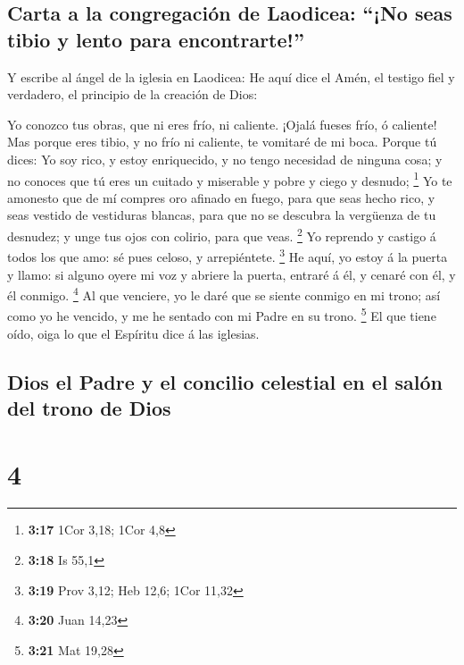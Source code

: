 \hypertarget{carta-a-la-congregaciuxf3n-de-laodicea-no-seas-tibio-y-lento-para-encontrarte}{%
\subsection{Carta a la congregación de Laodicea: ``¡No seas tibio y
lento para
encontrarte!''}\label{carta-a-la-congregaciuxf3n-de-laodicea-no-seas-tibio-y-lento-para-encontrarte}}

 Y escribe al ángel de la iglesia en Laodicea: He aquí dice
el Amén, el testigo fiel y verdadero, el principio de la creación de
Dios:

 Yo conozco tus obras, que ni eres frío, ni caliente.
¡Ojalá fueses frío, ó caliente!  Mas porque eres tibio, y
no frío ni caliente, te vomitaré de mi boca.  Porque tú
dices: Yo soy rico, y estoy enriquecido, y no tengo necesidad de ninguna
cosa; y no conoces que tú eres un cuitado y miserable y pobre y ciego y
desnudo; \footnote{\textbf{3:17} 1Cor 3,18; 1Cor 4,8}  Yo
te amonesto que de mí compres oro afinado en fuego, para que seas hecho
rico, y seas vestido de vestiduras blancas, para que no se descubra la
vergüenza de tu desnudez; y unge tus ojos con colirio, para que veas.
\footnote{\textbf{3:18} Is 55,1}  Yo reprendo y castigo á
todos los que amo: sé pues celoso, y arrepiéntete. \footnote{\textbf{3:19}
  Prov 3,12; Heb 12,6; 1Cor 11,32}  He aquí, yo estoy á la
puerta y llamo: si alguno oyere mi voz y abriere la puerta, entraré á
él, y cenaré con él, y él conmigo. \footnote{\textbf{3:20} Juan 14,23}
 Al que venciere, yo le daré que se siente conmigo en mi
trono; así como yo he vencido, y me he sentado con mi Padre en su trono.
\footnote{\textbf{3:21} Mat 19,28}  El que tiene oído, oiga
lo que el Espíritu dice á las iglesias.

\hypertarget{dios-el-padre-y-el-concilio-celestial-en-el-saluxf3n-del-trono-de-dios}{%
\subsection{Dios el Padre y el concilio celestial en el salón del trono
de
Dios}\label{dios-el-padre-y-el-concilio-celestial-en-el-saluxf3n-del-trono-de-dios}}

\hypertarget{section-3}{%
\section{4}\label{section-3}}

